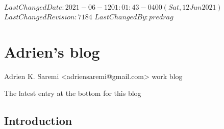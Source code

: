 {$LastChangedDate: 2021-06-12 01:01:43 -0400 (Sat, 12 Jun 2021) $}
{$LastChangedRevision: 7184 $} {$LastChangedBy: predrag $}

\chapter{Adrien's blog}
\label{chap:blogAKS}

\bigskip

\hfill   {\large Adrien K. Saremi <adriensaremi@gmail.com> work blog}

\hfill   {\color{red} The latest entry at the bottom for this blog}

\bigskip



\section{Introduction}
\label{sect:introAKS}

